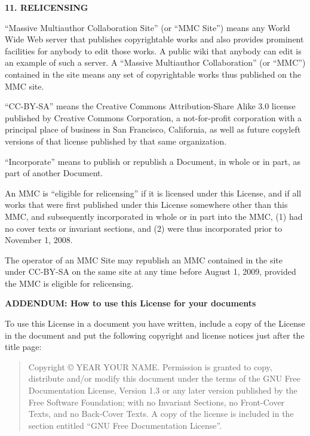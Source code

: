 \documentclass[11pt]{book}
\numberwithin{example}{chapter}
\begin{document}
\begin{center}
{\Large\bf 11. RELICENSING\par}

\end{center}


``Massive Multiauthor Collaboration Site'' (or ``MMC Site'') means any
World Wide Web server that publishes copyrightable works and also
provides prominent facilities for anybody to edit those works.  A
public wiki that anybody can edit is an example of such a server.  A
``Massive Multiauthor Collaboration'' (or ``MMC'') contained in the
site means any set of copyrightable works thus published on the MMC
site.

``CC-BY-SA'' means the Creative Commons Attribution-Share Alike 3.0
license published by Creative Commons Corporation, a not-for-profit
corporation with a principal place of business in San Francisco,
California, as well as future copyleft versions of that license
published by that same organization.

``Incorporate'' means to publish or republish a Document, in whole or
in part, as part of another Document.

An MMC is ``eligible for relicensing'' if it is licensed under this
License, and if all works that were first published under this License
somewhere other than this MMC, and subsequently incorporated in whole
or in part into the MMC, (1) had no cover texts or invariant sections,
and (2) were thus incorporated prior to November 1, 2008.

The operator of an MMC Site may republish an MMC contained in the site
under CC-BY-SA on the same site at any time before August 1, 2009,
provided the MMC is eligible for relicensing.


\begin{center}
{\Large\bf ADDENDUM: How to use this License for your documents\par}

\end{center}

To use this License in a document you have written, include a copy of
the License in the document and put the following copyright and
license notices just after the title page:

\bigskip
\begin{quote}
    Copyright \copyright{}  YEAR  YOUR NAME.
    Permission is granted to copy, distribute and/or modify this document
    under the terms of the GNU Free Documentation License, Version 1.3
    or any later version published by the Free Software Foundation;
    with no Invariant Sections, no Front-Cover Texts, and no Back-Cover Texts.
    A copy of the license is included in the section entitled ``GNU
    Free Documentation License''.
\end{quote}
\bigskip
    
\end{document}
